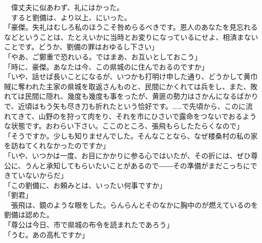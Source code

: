 \documentclass[
  paper=a5,
  fontsize=10pt,
  jafontsize=9.5pt,
  tate,                  %
  open_bracket_pos=nibu, %
]{jlreq}
\begin{document}
　偉丈夫に似あわず、礼にはかった。\\


　すると劉備は、より以上、にいった。\\


「豪傑。失礼はむしろ私のほうこそ咎めらるべきです。恩人のあなたを見忘れるなどということは、たとえいかに当時とお変りになっているにせよ、相済まないことです。どうか、劉備の罪はおゆるし下さい」\\


「やあ、ご鄭重で恐れいる。ではまあ、お互いとしておこう」\\


「時に、豪傑。あなたは今、この県城のに住んでおるのですか」\\


「いや、話せば長いことになるが、いつかも打明け申した通り、どうかして黄巾賊に奪われた主家の県城を取返さんものと、民間にかくれては兵をし、また、敗れては民間に隠れ、幾度も幾度も事をったが、黄匪の勢力はさかんになるばかりで、近頃はもう矢も尽き刀も折れたという恰好です。……で先頃から、このに流れてきて、山野のを狩って肉をり、それを市にひさいで露命をつないでおるような状態です。おわらい下さい。ここのところ、張飛もらしたたらくなので」\\


「そうですか。少しも知りませんでした。そんなことなら、なぜ楼桑村の私の家を訪ねてくれなかったのですか」\\


「いや、いつかは一度、お目にかかりに参る心ではいたが、その折には、ぜひ尊公に、うんと承知してもらいたいことがあるので――その準備がまだこっちにできていないからだ」\\


「この劉備に、お頼みとは、いったい何事ですか」\\


「劉君」\\


　張飛は、鏡のような眼をした。らんらんとそのなかに胸中のが燃えているのを劉備は認めた。\\


「尊公は今日、市で県城の布令を読まれたであろう」\\


「うむ。あの高札ですか」\\
\end{document}
